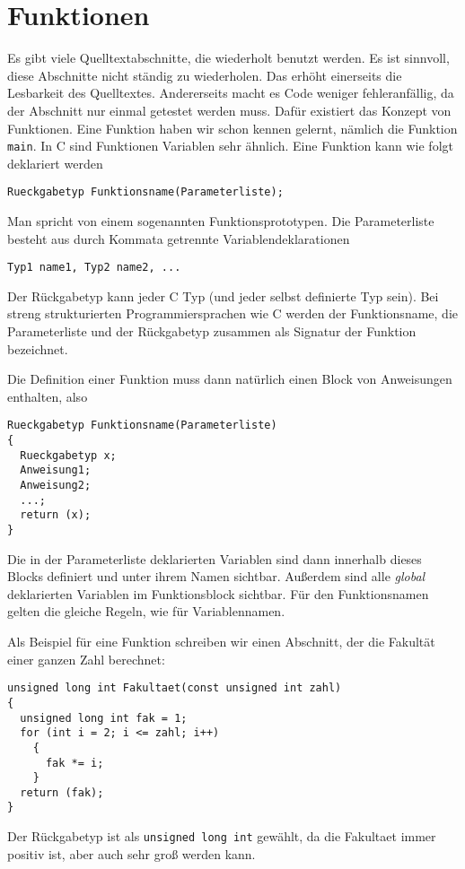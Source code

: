 \section{Funktionen}

Es gibt viele Quelltextabschnitte, die wiederholt benutzt werden.
Es ist sinnvoll, diese Abschnitte nicht ständig zu wiederholen.
Das erhöht einerseits die Lesbarkeit des Quelltextes.
Andererseits macht es Code weniger fehleranfällig, da der Abschnitt nur einmal getestet werden muss.
Dafür existiert das Konzept von Funktionen.
Eine Funktion haben wir schon kennen gelernt, nämlich die Funktion \verb|main|. 
In C sind Funktionen Variablen sehr ähnlich.
Eine Funktion kann wie folgt deklariert werden
\begin{lstlisting}
Rueckgabetyp Funktionsname(Parameterliste);
\end{lstlisting}
Man spricht von einem sogenannten Funktionsprototypen.
Die Parameterliste besteht aus durch Kommata getrennte Variablendeklarationen
\begin{lstlisting}
Typ1 name1, Typ2 name2, ...
\end{lstlisting}
Der Rückgabetyp kann jeder C Typ (und jeder selbst definierte Typ sein).
Bei streng strukturierten Programmiersprachen wie C werden der Funktionsname, die Parameterliste und der Rückgabetyp zusammen als Signatur der Funktion bezeichnet.

Die Definition einer Funktion muss dann natürlich einen Block von Anweisungen enthalten, also
\begin{lstlisting}
Rueckgabetyp Funktionsname(Parameterliste)
{
  Rueckgabetyp x;
  Anweisung1;
  Anweisung2;
  ...;
  return (x);
}
\end{lstlisting}
Die in der Parameterliste deklarierten Variablen sind dann innerhalb dieses Blocks definiert und unter ihrem Namen sichtbar.
Außerdem sind alle \emph{global} deklarierten Variablen im Funktionsblock sichtbar.
Für den Funktionsnamen gelten die gleiche Regeln, wie für Variablennamen.

Als Beispiel für eine Funktion schreiben wir einen Abschnitt, der die Fakultät einer ganzen Zahl berechnet:
\begin{lstlisting}
unsigned long int Fakultaet(const unsigned int zahl)
{
  unsigned long int fak = 1;
  for (int i = 2; i <= zahl; i++)
    {
      fak *= i;
    }
  return (fak);
}
\end{lstlisting}
Der Rückgabetyp ist als \verb|unsigned long int| gewählt, da die Fakultaet immer positiv ist, aber auch sehr groß werden kann.

